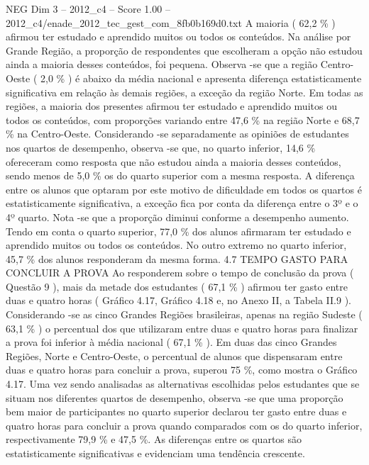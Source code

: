 \begin{textsample}{NEG Dim 3 – 2012\_c4 – Score 1.00 – 2012\_c4/enade\_2012\_tec\_gest\_com\_8fb0b169d0.txt}
A maioria ( 62,2 \% ) afirmou ter estudado e aprendido muitos ou todos os conteúdos.
Na análise por Grande Região, a proporção de respondentes que escolheram a opção não estudou ainda a maioria desses conteúdos, foi pequena.
Observa -se que a região Centro-Oeste ( 2,0 \% ) é abaixo da média nacional e apresenta diferença estatisticamente significativa em relação às demais regiões, a exceção da região Norte.
Em todas as regiões, a maioria dos presentes afirmou ter estudado e aprendido muitos ou todos os conteúdos, com proporções variando entre 47,6 \% na região Norte e 68,7 \% na Centro-Oeste.
Considerando -se separadamente as opiniões de estudantes nos quartos de desempenho, observa -se que, no quarto inferior, 14,6 \% ofereceram como resposta que não estudou ainda a maioria desses conteúdos, sendo menos de 5,0 \% os do quarto superior com a mesma resposta.
A diferença entre os alunos que optaram por este motivo de dificuldade em todos os quartos é estatisticamente significativa, a exceção fica por conta da diferença entre o 3º e o 4º quarto.
Nota -se que a proporção diminui conforme a desempenho aumento.
Tendo em conta o quarto superior, 77,0 \% dos alunos afirmaram ter estudado e aprendido muitos ou todos os conteúdos.
No outro extremo no quarto inferior, 45,7 \% dos alunos responderam da mesma forma. 4.7 TEMPO GASTO PARA CONCLUIR A PROVA Ao responderem sobre o tempo de conclusão da prova ( Questão 9 ), mais da metade dos estudantes ( 67,1 \% ) afirmou ter gasto entre duas e quatro horas ( Gráfico 4.17, Gráfico 4.18 e, no Anexo II, a Tabela II.9 ).
Considerando -se as cinco Grandes Regiões brasileiras, apenas na região Sudeste ( 63,1 \% ) o percentual dos que utilizaram entre duas e quatro horas para finalizar a prova foi inferior à média nacional ( 67,1 \% ).
Em duas das cinco Grandes Regiões, Norte e Centro-Oeste, o percentual de alunos que dispensaram entre duas e quatro horas para concluir a prova, superou 75 \%, como mostra o Gráfico 4.17.
Uma vez sendo analisadas as alternativas escolhidas pelos estudantes que se situam nos diferentes quartos de desempenho, observa -se que uma proporção bem maior de participantes no quarto superior declarou ter gasto entre duas e quatro horas para concluir a prova quando comparados com os do quarto inferior, respectivamente 79,9 \% e 47,5 \%.
As diferenças entre os quartos são estatisticamente significativas e evidenciam uma tendência crescente.

\end{textsample}
